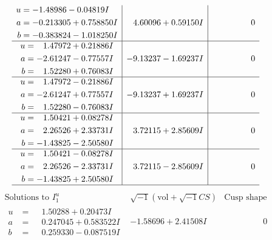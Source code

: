 \documentclass[1p]{elsarticle_modified}
\theoremstyle{definition}
\newcommand{\I}{\sqrt{-1}}
\begin{document}
$$\begin{array}{c|c|c}
\begin{aligned}
u &= -1.48986 - 0.04819 I \\
a &= -0.213305 + 0.758850 I \\
b &= -0.383824 - 1.018250 I\end{aligned}
 & \phantom{-}4.60096 + 0.59150 I & \phantom{-0.000000 } 0 \\ \hline\begin{aligned}
u &= \phantom{-}1.47972 + 0.21886 I \\
a &= -2.61247 - 0.77557 I \\
b &= \phantom{-}1.52280 + 0.76083 I\end{aligned}
 & -9.13237 - 1.69237 I & \phantom{-0.000000 } 0 \\ \hline\begin{aligned}
u &= \phantom{-}1.47972 - 0.21886 I \\
a &= -2.61247 + 0.77557 I \\
b &= \phantom{-}1.52280 - 0.76083 I\end{aligned}
 & -9.13237 + 1.69237 I & \phantom{-0.000000 } 0 \\ \hline\begin{aligned}
u &= \phantom{-}1.50421 + 0.08278 I \\
a &= \phantom{-}2.26526 + 2.33731 I \\
b &= -1.43825 - 2.50580 I\end{aligned}
 & \phantom{-}3.72115 + 2.85609 I & \phantom{-0.000000 } 0 \\ \hline\begin{aligned}
u &= \phantom{-}1.50421 - 0.08278 I \\
a &= \phantom{-}2.26526 - 2.33731 I \\
b &= -1.43825 + 2.50580 I\end{aligned}
 & \phantom{-}3.72115 - 2.85609 I & \phantom{-0.000000 } 0\\
 \hline 
 \end{array}$$\newpage$$\begin{array}{c|c|c}  
\text{Solutions to }I^u_{1}& \I (\text{vol} + \sqrt{-1}CS) & \text{Cusp shape}\\
 \hline 
\begin{aligned}
u &= \phantom{-}1.50288 + 0.20473 I \\
a &= \phantom{-}0.247045 + 0.583522 I \\
b &= \phantom{-}0.259330 - 0.087519 I\end{aligned}
 & -1.58696 + 2.41508 I & \phantom{-0.000000 } 0 \\ \hline\begin{aligned}

\end{aligned}
\end{array}$$
\end{document}

